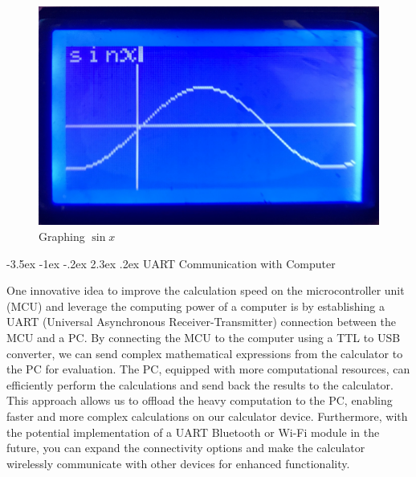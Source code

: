 \documentclass[a4paper, twoside]{report}
\makeatletter
\renewcommand\section{\@startsection {section}{1}{-1em}%
  {-3.5ex \@plus -1ex \@minus -.2ex}%
  {2.3ex \@plus.2ex}%
  {\normalfont\Large\bfseries}}
\makeatother
\begin{document}
\begin{figure}[H]
    \centering
    \includegraphics[width=.7\textwidth]{LCDScreens/graphmode.jpeg}
    \caption{Graphing $\sin x$}
\end{figure}

\section{UART Communication with Computer}

One innovative idea to improve the calculation speed on the microcontroller unit (MCU) and leverage the computing power of a computer is by establishing a UART (Universal Asynchronous Receiver-Transmitter) connection between the MCU and a PC. By connecting the MCU to the computer using a TTL to USB converter, we can send complex mathematical expressions from the calculator to the PC for evaluation. The PC, equipped with more computational resources, can efficiently perform the calculations and send back the results to the calculator. This approach allows us to offload the heavy computation to the PC, enabling faster and more complex calculations on our calculator device. Furthermore, with the potential implementation of a UART Bluetooth or Wi-Fi module in the future, you can expand the connectivity options and make the calculator wirelessly communicate with other devices for enhanced functionality.
\end{document}
